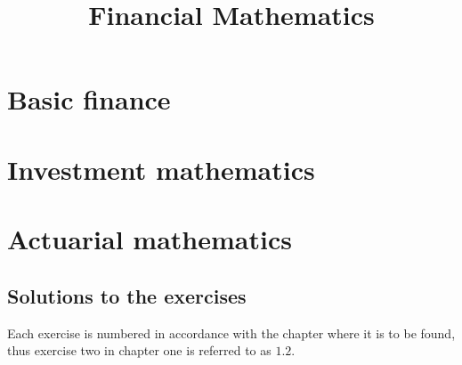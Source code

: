 \documentclass[11pt,twoside,openright]{memoir}
\title{Financial Mathematics}
\begin{document}
\let\cleardoublepage\clearpage
\maketitle

\tableofcontents
{}


\mainmatter
\part{Basic finance}

\part{Investment mathematics}
\part{Actuarial mathematics}


\appendix
\chapter{Solutions to the exercises}
Each exercise is numbered in accordance with the chapter where it is to be found, thus exercise two in chapter one is referred to as $1.2$.
\shipoutAnswer

\backmatter
\printindex
\end{document}
